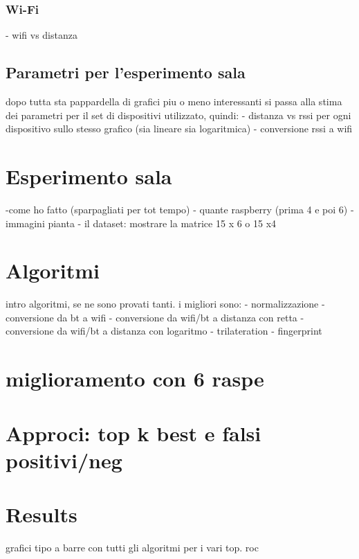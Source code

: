 \subsubsection{Wi-Fi}
- wifi vs distanza

\subsection{Parametri per l'esperimento sala}
dopo tutta sta pappardella di grafici piu o meno interessanti si passa alla stima dei parametri per il set di dispositivi utilizzato, quindi:
- distanza vs rssi per ogni dispositivo sullo stesso grafico (sia lineare sia logaritmica)
- conversione rssi a wifi

\section{Esperimento sala}
-come ho fatto (sparpagliati per tot tempo)
- quante raspberry (prima 4 e poi 6)
- immagini pianta
- il dataset: mostrare la matrice 15 x 6 o 15 x4

\section{Algoritmi}
intro algoritmi, se ne sono provati tanti. i migliori sono: 
- normalizzazione
- conversione da bt a wifi
- conversione da wifi/bt a distanza con retta
- conversione da wifi/bt a distanza con logaritmo
- trilateration
- fingerprint

\section{miglioramento con 6 raspe}

\section{Approci: top k best e falsi positivi/neg	}


\section{Results}
grafici tipo a barre con tutti gli algoritmi per i vari top.
roc